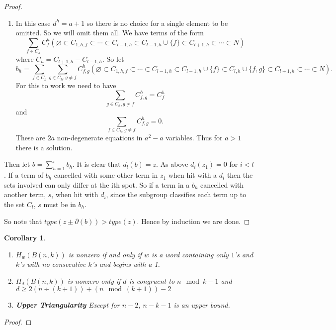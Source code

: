 \documentclass{amsart}
\newtheorem{corollary}[theorem]{Corollary}
\begin{document}
\begin{proof}
\begin{enumerate}
\begin{enumerate}
 	  \item In this case $d^h = a+1$ so there is no choice for a single element to be omitted. So we will omit them all.
	    We have terms of the form  
	    $$\sum_{f \in C_h} C^h_f (\varnothing \subset C_{1, h, f} \subset \cdots 
	    \subset C_{l-1, h} \subset
	    C_{l-1, h} \cup \{f\} \subset C_{l+1, h} \subset \cdots \subset N)$$ where 
          $C_h= C_{l+1, h} - C_{l-1, h}$. So let 
          $$b_h = \sum_{f \in C_h} \sum_{g \in C_h, g \ne f}
          C^h_{f, g} (\varnothing \subset C_{1, h, f} \subset \cdots 
	    \subset C_{l-1, h} \subset
	    C_{l-1, h} \cup \{f\} \subset C_{l, h} \cup \{f, g\}\subset C_{l+1, h} \subset \cdots \subset N).$$ 
	    For 
	    this to work we need to have $$\sum_{g \in C_h, g \ne f} C^h_{f, g} = C^h_f$$ and 
	    $$\sum_{f \in C_h, g \ne f} C^h_{f, g} = 0.$$ These are $2a$ non-degenerate equations in 
	    $a^2-a$ variables. Thus for $a>1$ there is a solution.
       \end{enumerate}
       Then let $b=\sum_{h=1}^v b_h$. It is clear that $d_l(b)=z$. As above $d_i(z_1) = 0$ for $i < l$. If a term of $b_h$
       cancelled with some other term in $z_1$ when hit with a $d_i$ then the sets involved can only differ at the ith 
       spot. So if a term in a $b_h$ cancelled with another term, $s$,  when hit with $d_i$, since the subgroup
 	 classifies each term up to the set $C_l$, $s$ must be in $b_h$.

	     
    \end{enumerate}

    So note that $type(z \pm \partial(b)) > type(z)$. Hence by induction we are done.
  \end{proof}

  \begin{corollary}


    \begin{enumerate}
      \item $H_w(B(n, k))$ is nonzero if and only if $w$ is a word containing only $1$'s and $k$'s with 
        no consecutive $k$'s and begins with a 1.
      \item $H_d(B(n, k))$ is nonzero only if $d$ is congruent to $n \mod k-1$ and $d \ge 2(n \div (k+1)) + (n \mod
        (k+1)) - 2$
      \item {\bf Upper Triangularity} Except for $n-2$, $n-k-1$ is an upper bound.
    \end{enumerate}
  \end{corollary}
  \begin{proof}
  \end{proof}  
\end{document}
